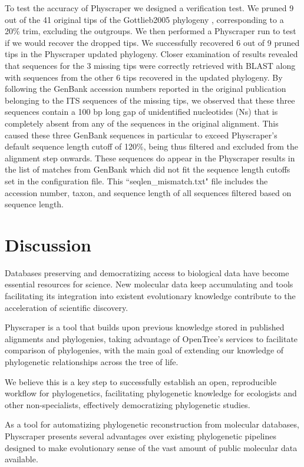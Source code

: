 \documentclass{bmcart}
\begin{document}
To test the accuracy of Physcraper we designed a verification test.
We pruned 9 out of the 41 original tips of the Gottlieb2005 phylogeny \cite{gottlieb2005molecular},
corresponding to a 20\% trim, excluding the outgroups. We then performed a Physcraper
run to test if we would recover the dropped tips.
We successfully recovered 6 out of 9 pruned tips in the Physcraper updated phylogeny.
Closer examination of results revealed that sequences for the 3 missing tips were correctly retrieved
with BLAST along with sequences from the other 6 tips recovered in the updated phylogeny.
By following the GenBank accession numbers reported in the original publication
belonging to the ITS sequences of the missing tips, we observed that these three sequences
contain a 100 bp long gap of unidentified nucleotides (Ns) that is completely absent
from any of the sequences in the original alignment. This caused these three GenBank sequences
in particular to exceed Physcraper's default sequence length cutoff of 120\%, being thus
filtered and excluded from the alignment step onwards.
These sequences do appear in the Physcraper results in the list of matches from
GenBank which did not fit the sequence length cutoffs set in the configuration file.
This ``seqlen\_mismatch.txt" file includes the accession number, taxon, and sequence
length of all sequences filtered based on sequence length.


\section*{Discussion}
Databases preserving and democratizing access to biological data
have become essential resources for science.
New molecular data keep accumulating and tools facilitating its integration into
existent evolutionary knowledge contribute to the acceleration of scientific discovery.

Physcraper is a tool that builds upon previous knowledge stored in published
alignments and phylogenies, taking advantage of OpenTree's services to facilitate comparison
of phylogenies, with the main goal of extending our knowledge of phylogenetic relationships
across the tree of life.

We believe this is a key step to successfully establish an open, reproducible workflow for phylogenetics,
facilitating phylogenetic knowledge for ecologists and other non-specialists, effectively
democratizing phylogenetic studies.

As a tool for automatizing phylogenetic reconstruction from molecular databases,
Physcraper presents several advantages over existing phylogenetic pipelines designed to
make evolutionary sense of the vast amount of
public molecular data available.
\end{document}
